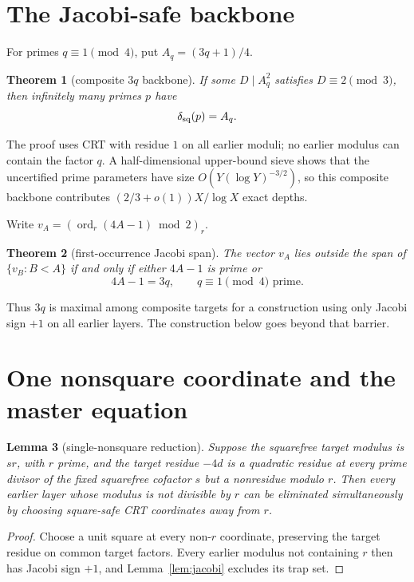 \documentclass[11pt]{article}
\newtheorem{theorem}{Theorem}
\newtheorem{lemma}[theorem]{Lemma}
\theoremstyle{definition}
\newcommand{\sqdepth}{\delta_{\rm sq}}
\begin{document}
\section{The Jacobi-safe backbone}
For primes $q\equiv1\pmod4$, put $A_q=(3q+1)/4$.

\begin{theorem}[composite $3q$ backbone]\label{thm:3q}
If some $D\mid A_q^2$ satisfies $D\equiv2\pmod3$, then infinitely many primes $p$ have
\[
\sqdepth(p)=A_q.
\]
\end{theorem}

The proof uses CRT with residue $1$ on all earlier moduli; no earlier modulus can contain the factor $q$. A half-dimensional upper-bound sieve shows that the uncertified prime parameters have size $O(Y(\log Y)^{-3/2})$, so this composite backbone contributes $(2/3+o(1))X/\log X$ exact depths.

Write $v_A=(\operatorname{ord}_r(4A-1)\bmod2)_r$.

\begin{theorem}[first-occurrence Jacobi span]\label{thm:span}
The vector $v_A$ lies outside the span of $\{v_B:B<A\}$ if and only if either $4A-1$ is prime or
\[
4A-1=3q,\qquad q\equiv1\pmod4\text{ prime}.
\]
\end{theorem}

Thus $3q$ is maximal among composite targets for a construction using only Jacobi sign $+1$ on all earlier layers. The construction below goes beyond that barrier.

\section{One nonsquare coordinate and the master equation}
\begin{lemma}[single-nonsquare reduction]\label{lem:single}
Suppose the squarefree target modulus is $sr$, with $r$ prime, and the target residue $-4d$ is a quadratic residue at every prime divisor of the fixed squarefree cofactor $s$ but a nonresidue modulo $r$. Then every earlier layer whose modulus is not divisible by $r$ can be eliminated simultaneously by choosing square-safe CRT coordinates away from $r$.
\end{lemma}

\begin{proof}
Choose a unit square at every non-$r$ coordinate, preserving the target residue on common target factors. Every earlier modulus not containing $r$ then has Jacobi sign $+1$, and Lemma~\ref{lem:jacobi} excludes its trap set.
\end{proof}
\end{document}

